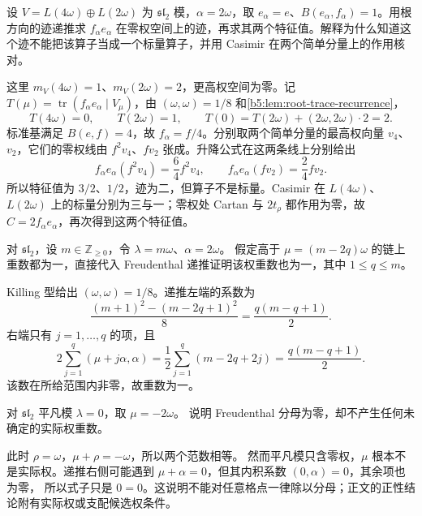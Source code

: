 \begin{exercise}\label{b5:ex:19-root-trace-sl2}
	设 \(V=L(4\omega)\oplus L(2\omega)\) 为 \(\mathfrak{sl}_2\) 模，\(\alpha=2\omega\)，取 \(e_\alpha=e\)、\(B(e_\alpha,f_\alpha)=1\)。用根方向的迹递推求 \(f_\alpha e_\alpha\) 在零权空间上的迹，再求其两个特征值。解释为什么知道这个迹不能把该算子当成一个标量算子，并用 Casimir 在两个简单分量上的作用核对。
\end{exercise}
\begin{solution}
	这里 \(m_V(4\omega)=1\)、\(m_V(2\omega)=2\)，更高权空间为零。记 \(T(\mu)=\operatorname{tr}(f_\alpha e_\alpha\mid V_\mu)\)，由 \((\omega,\omega)=1/8\) 和\cref{b5:lem:root-trace-recurrence}，
	\[
		T(4\omega)=0,\qquad T(2\omega)=1,\qquad T(0)=T(2\omega)+(2\omega,2\omega)\cdot2=2.
	\]
	标准基满足 \(B(e,f)=4\)，故 \(f_\alpha=f/4\)。分别取两个简单分量的最高权向量 \(v_4\)、\(v_2\)，它们的零权线由 \(f^2v_4\)、\(fv_2\) 张成。升降公式在这两条线上分别给出
	\[
		f_\alpha e_\alpha(f^2v_4)=\frac64f^2v_4,\qquad f_\alpha e_\alpha(fv_2)=\frac24fv_2.
	\]
	所以特征值为 \(3/2\)、\(1/2\)，迹为二，但算子不是标量。Casimir 在 \(L(4\omega)\)、\(L(2\omega)\) 上的标量分别为三与一；零权处 Cartan 与 \(2t_\rho\) 都作用为零，故 \(C=2f_\alpha e_\alpha\)，再次得到这两个特征值。
\end{solution}

\begin{exercise}\label{b5:ex:19-freudenthal-sl2}
	对 \(\mathfrak{sl}_2\)，设 \(m\in\mathbb Z_{\ge0}\)，令 \(\lambda=m\omega\)、\(\alpha=2\omega\)。 假定高于 \(\mu=(m-2q)\omega\) 的链上重数都为一，直接代入 Freudenthal 递推证明该权重数也为一，其中 \(1\le q\le m\)。
\end{exercise}
\begin{solution}
	Killing 型给出 \((\omega,\omega)=1/8\)。递推左端的系数为
	\[
		\frac{(m+1)^2-(m-2q+1)^2}{8} =\frac{q(m-q+1)}2.
	\]
	右端只有 \(j=1,\ldots,q\) 的项，且
	\[
		2\sum_{j=1}^q(\mu+j\alpha,\alpha) =\frac12\sum_{j=1}^q(m-2q+2j) =\frac{q(m-q+1)}2.
	\]
	该数在所给范围内非零，故重数为一。
\end{solution}

\begin{exercise}\label{b5:ex:19-zero-denominator-outside}
	对 \(\mathfrak{sl}_2\) 平凡模 \(\lambda=0\)，取 \(\mu=-2\omega\)。 说明 Freudenthal 分母为零，却不产生任何未确定的实际权重数。
\end{exercise}
\begin{solution}
	此时 \(\rho=\omega\)，\(\mu+\rho=-\omega\)，所以两个范数相等。 然而平凡模只含零权，\(\mu\) 根本不是实际权。递推右侧可能遇到 \(\mu+\alpha=0\)，但其内积系数 \((0,\alpha)=0\)，其余项也为零， 所以式子只是 \(0=0\)。这说明不能对任意格点一律除以分母；正文的正性结论附有实际权或支配候选权条件。
\end{solution}


